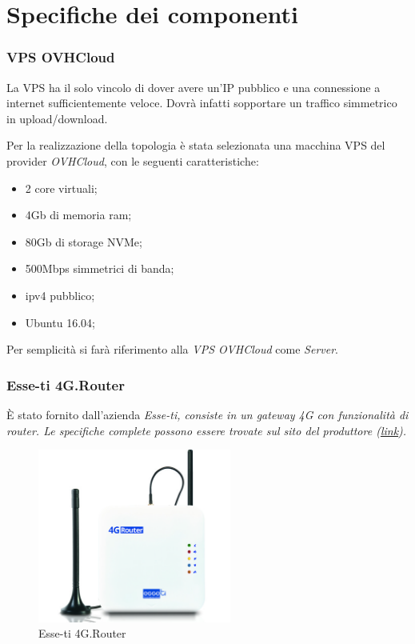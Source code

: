 \section{Specifiche dei componenti \ok}

\subsubsection{VPS OVHCloud \ok}
\label{subsec:vps-ovhcloud}

La VPS ha il solo vincolo di dover avere un'IP pubblico e una connessione a internet sufficientemente veloce. Dovrà infatti sopportare un traffico simmetrico in upload/download.

Per la realizzazione della topologia è stata selezionata una macchina VPS del provider \textit{OVHCloud}, con le seguenti caratteristiche:


\begin{itemize}[nosep]
	\item 2 core virtuali;
	\item 4Gb di memoria ram;
	\item 80Gb di storage NVMe;
	\item 500Mbps simmetrici di banda;
	\item ipv4 pubblico;
	\item Ubuntu 16.04;
\end{itemize}

Per semplicità si farà riferimento alla \textit{VPS OVHCloud} come \textit{Server}.

\subsubsection{Esse-ti 4G.Router \ok}

È stato fornito dall'azienda \it{Esse-ti}, consiste in un gateway 4G con funzionalità di router. Le specifiche complete possono essere trovate sul sito del produttore (\href{https://www.esse-ti.it/4g-router}{link}).


\begin{figure}[ht]
	\centering
	\includegraphics[width=240px]{immagini/4grouter.jpg}
	\caption{Esse-ti 4G.Router}
	\label{fig:esse-ti-router-4g}
\end{figure}

